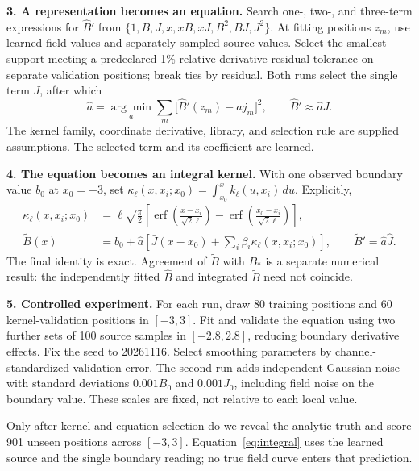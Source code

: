 \documentclass[11pt,letterpaper]{article}
\begin{document}
\textbf{3. A representation becomes an equation.}
Search one-, two-, and three-term expressions for $\widehat B'$ from
$\{1,B,J,x,xB,xJ,B^2,BJ,J^2\}$. At fitting positions $z_m$, use learned field values
and separately sampled source values. Select the smallest support meeting a
predeclared 1\% relative derivative-residual tolerance on separate validation positions;
break ties by residual. Both runs select the single term $J$, after which
\begin{equation}
\widehat a=\underset{a}{\arg\min}\sum_m
\bigl[\widehat B'(z_m)-a j_m\bigr]^2,
\qquad \widehat B'\approx\widehat a J.
\label{eq:law}
\end{equation}
The kernel family, coordinate derivative, library, and selection rule are supplied
assumptions. The selected term and its coefficient are learned.

\textbf{4. The equation becomes an integral kernel.}
With one observed boundary value $b_0$ at $x_0=-3$, set
$\kappa_\ell(x,x_i;x_0)=\int_{x_0}^{x}k_\ell(u,x_i)\,du$. Explicitly,
\begin{align}
\kappa_\ell(x,x_i;x_0)&=\ell\sqrt{\frac\pi2}\left[
\operatorname{erf}\!\left(\frac{x-x_i}{\sqrt2\ell}\right)
-\operatorname{erf}\!\left(\frac{x_0-x_i}{\sqrt2\ell}\right)\right],\nonumber\\[-3pt]
\widetilde B(x)&=b_0+\widehat a\!\left[\bar J(x-x_0)
+\sum_i\beta_i\kappa_\ell(x,x_i;x_0)\right],\qquad
\widetilde B'=\widehat a\widehat J.
\label{eq:integral}
\end{align}
The final identity is exact. Agreement of $\widetilde B$ with $B_*$ is a separate
numerical result: the independently fitted $\widehat B$ and integrated $\widetilde B$
need not coincide.

\newpage
\textbf{5. Controlled experiment.}
For each run, draw 80 training positions and 60 kernel-validation positions in
$[-3,3]$. Fit and validate the equation using two further sets of 100 source samples
in $[-2.8,2.8]$, reducing boundary derivative effects. Fix the seed to 20261116.
Select smoothing parameters by channel-standardized validation error.
The second run adds independent Gaussian
noise with standard deviations $0.001B_0$ and $0.001J_0$, including field noise on
the boundary value. These scales are fixed, not relative to each local value.

Only after kernel and equation selection do we reveal the analytic truth and score
901 unseen positions across $[-3,3]$. Equation~\eqref{eq:integral} uses the learned
source and the single boundary reading; no true field curve enters that prediction.
\end{document}
